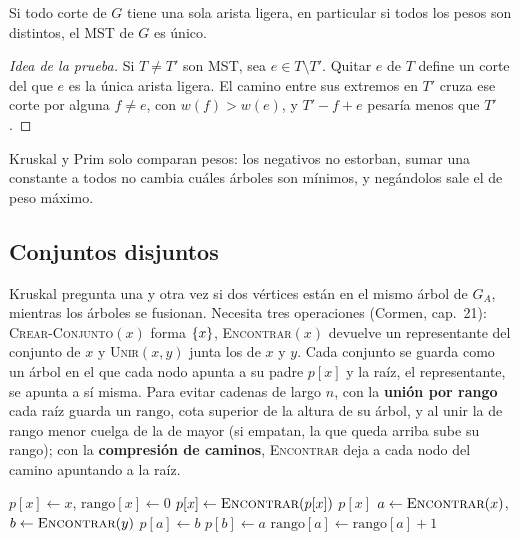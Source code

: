 \documentclass[11pt,letterpaper]{article}
\begin{document}
\begin{teorema}
  \label{teo:unicidad-mst}
  Si todo corte de $G$ tiene una sola arista ligera, en particular si
  todos los pesos son distintos, el MST de $G$ es único.
\end{teorema}

\begin{proof}[Idea de la prueba]
  Si $T \neq T'$ son MST, sea $e \in T \setminus T'$. Quitar $e$ de
  $T$ define un corte del que $e$ es la única arista ligera. El camino
  entre sus extremos en $T'$ cruza ese corte por alguna $f \neq e$, con
  $w(f) > w(e)$, y $T' - f + e$ pesaría menos que $T'$.
\end{proof}

\begin{observacion}
  Kruskal y Prim solo comparan pesos: los negativos no estorban, sumar
  una constante a todos no cambia cuáles árboles son mínimos, y
  negándolos sale el de peso máximo.
\end{observacion}


\subsection*{Conjuntos disjuntos}

Kruskal pregunta una y otra vez si dos vértices están en el mismo
árbol de $G_A$, mientras los árboles se fusionan. Necesita tres
operaciones (Cormen, cap.\ 21): \textsc{Crear-Conjunto}$(x)$ forma
$\left\{ x \right\}$, \textsc{Encontrar}$(x)$ devuelve un representante del
conjunto de $x$ y \textsc{Unir}$(x, y)$ junta los de $x$ y $y$. Cada
conjunto se guarda como un árbol en el que cada nodo apunta a su padre
$p[x]$ y la raíz, el representante, se apunta a sí misma. Para evitar
cadenas de largo $n$, con la \textbf{unión por rango} cada raíz guarda
un $\text{rango}$, cota superior de la altura de su árbol, y al unir
la de rango menor cuelga de la de mayor (si empatan, la que queda
arriba sube su rango); con la \textbf{compresión de caminos},
\textsc{Encontrar} deja a cada nodo del camino apuntando a la raíz.

\begin{algorithm}[H]
\caption{Conjuntos disjuntos con unión por rango y compresión de
         caminos}
\label{alg:conjuntos-disjuntos}
\begin{algorithmic}[1]
  \State $p[x] \gets x$, \quad $\text{rango}[x] \gets 0$
\EndProcedure
{}
    \State $p[x] \gets \textsc{Encontrar}(p[x])$
  \EndIf
  \State \Return $p[x]$
\EndProcedure
{}
  \State $a \gets \textsc{Encontrar}(x)$, \quad
         $b \gets \textsc{Encontrar}(y)$
    \State $p[a] \gets b$ 
  \Else
    \State $p[b] \gets a$
      \State $\text{rango}[a] \gets \text{rango}[a] + 1$
    \EndIf
  \EndIf
\EndProcedure
\end{algorithmic}
\end{algorithm}
\end{document}
